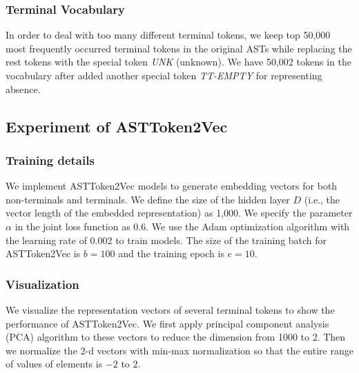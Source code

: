 \documentclass[E]{compsoft}
\begin{document}
\subsubsection{Terminal Vocabulary}
In order to deal with too many different terminal tokens, we keep top 50,000 most frequently occurred terminal tokens in the original ASTs while replacing the rest tokens with the special token \emph{UNK} (unknown).  
We have 50,002 tokens in the vocabulary after added another special token \textit{TT-EMPTY} for representing absence.


\subsection{Experiment of ASTToken2Vec}
\subsubsection{Training details}
We implement ASTToken2Vec models to generate embedding vectors for both non-terminals and terminals. We define the size of the hidden layer $D$ (i.e., the vector length of the embedded representation) as 1,000. 
We specify the parameter $\alpha$ in the joint loss function as 0.6.
We use the Adam optimization algorithm with the learning rate of 0.002 to train models. 
The size of the training batch for ASTToken2Vec is $b=100$ and the training epoch is $e=10$.

\subsubsection{Visualization}
We visualize the representation vectors of several terminal tokens to show the performance of ASTToken2Vec.
We first apply principal component analysis (PCA) algorithm to these vectors to reduce the dimension from 1000 to 2. 
Then we normalize the 2-d vectors with min-max normalization so that the entire range of values of elements is $-2$ to $2$.
\end{document}

